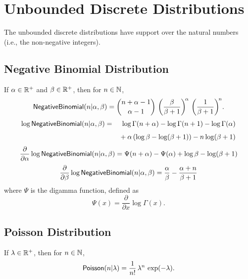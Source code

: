 \section{Unbounded Discrete Distributions}

The unbounded discrete distributions have support over the natural
numbers (i.e., the non-negative integers).

\subsection{Negative Binomial Distribution}

If $\alpha \in \mathbb{R}^+$ and $\beta \in \mathbb{R}^+$, then for $n \in
\mathbb{N}$,
\[
\mbox{\sf NegativeBinomial}(n|\alpha,\beta)
 = 
{{n + \alpha - 1} \choose {\alpha - 1}}
\,
\left( \frac{\beta}{\beta+1} \right)^{\!\alpha}
\,
\left( \frac{1}{\beta + 1} \right)^{\!n} \!.
\]
\begin{eqnarray*}
\log \mbox{\sf NegativeBinomial}(n|\alpha,\beta)
& = & \log \Gamma(n + \alpha) 
  - \log \Gamma(n + 1)
  - \log \Gamma(\alpha)
\\[4pt]
& & 
  {} + \alpha \left(\log \beta - \log (\beta + 1) \right)
  - n \log (\beta + 1)
\end{eqnarray*}
\[
\frac{\partial}{\partial \alpha} 
\log \mbox{\sf NegativeBinomial}(n|\alpha,\beta)
= \Psi(n + \alpha)
- \Psi(\alpha)
+ \log \beta
- \log (\beta + 1)
\]
\[
\frac{\partial}{\partial \beta} 
\log \mbox{\sf NegativeBinomial}(n|\alpha,\beta)
= \frac{\alpha}{\beta} - \frac{\alpha + n}{\beta + 1}
\]
where $\Psi$ is the digamma function, defined as
\[
\Psi(x) = \frac{\partial}{\partial x} \log \Gamma(x).
\]

\begin{description}
%
%
\end{description}


\subsection{Poisson Distribution}

If $\lambda \in \mathbb{R}^+$, then for $n \in \mathbb{N}$,
\[
\mbox{\sf Poisson}(n|\lambda)
= 
\frac{1}{n!}
\,
\lambda^n 
\,
\exp(-\lambda).
\]

\begin{description}
\end{description}


